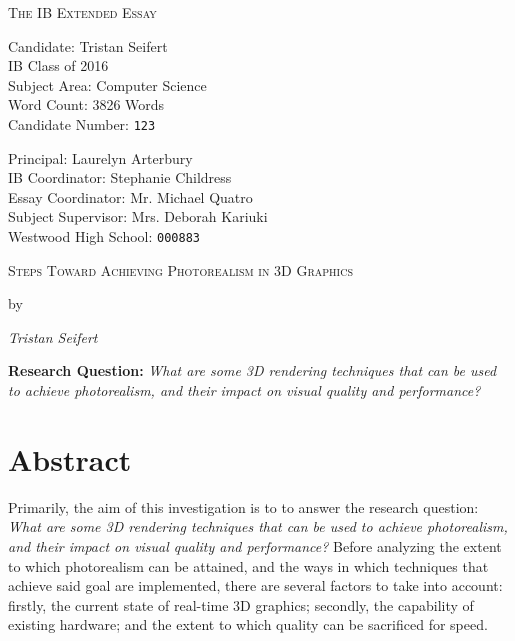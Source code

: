 \documentclass[11pt, oneside]{report}
\begin{document}
\begin{titlepage}
	{\centering\scshape\Huge The IB Extended Essay\par}
	\vspace{.66cm}
	
	\begin{minipage}[t]{0.4\textwidth}
		Candidate: Tristan Seifert \\
		IB Class of 2016 \\
		Subject Area: Computer Science \\
		Word Count: 3826 Words \\
		Candidate Number: \tt{123}
	\end{minipage}
	\hfill
	\begin{minipage}[t]{0.48\textwidth}
		\begin{flushright}
			Principal: Laurelyn Arterbury \\
			IB Coordinator: Stephanie Childress \\
			Essay Coordinator: Mr. Michael Quatro \\
			Subject Supervisor: Mrs. Deborah Kariuki \\
			Westwood High School: \tt{000883}
		\end{flushright}
	\end{minipage}

	\centering
	\vspace{6.5cm}
	{\scshape\Large Steps Toward Achieving Photorealism in 3D Graphics\par}
	{by\par}
	{\itshape Tristan Seifert\par}
	\vspace{6.5cm}
	{\bfseries Research Question:}
	{\textit{What are some 3D rendering techniques that can be used to achieve photorealism, and their impact on visual quality and performance?}}
	\vfill
\end{titlepage}

{
	\renewcommand{\addtocontents}[2]{}
	\chapter*{Abstract}
}

Primarily, the aim of this investigation is to to answer the research question: \textit{What are some 3D rendering techniques that can be used to achieve photorealism, and their impact on visual quality and performance?} Before analyzing the extent to which photorealism can be attained, and the ways in which techniques that achieve said goal are implemented, there are several factors to take into account: firstly, the current state of real-time 3D graphics; secondly, the capability of existing hardware; and the extent to which quality can be sacrificed for speed. 
\end{document}
